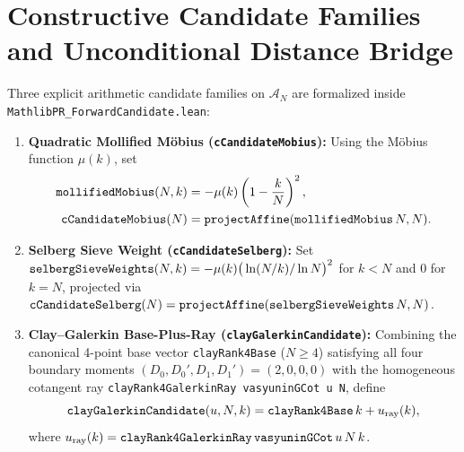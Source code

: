 \documentclass[11pt,a4paper]{article}
\theoremstyle{definition}
\begin{document}
\section{Constructive Candidate Families and Unconditional Distance Bridge}\label{sec:candidates}

Three explicit arithmetic candidate families on $\mathcal{A}_N$ are formalized inside \texttt{MathlibPR\_\allowbreak ForwardCandidate.lean}:
\begin{enumerate}[noitemsep]
  \item \textbf{Quadratic Mollified M\"obius (\texttt{cCandidateMobius}):} Using the M\"obius function $\mu(k)$, set
  \begin{align}
  \text{\texttt{mollifiedMobius}}(N, k) &= -\mu(k)\left(1 - \frac{k}{N}\right)^2, \\
  \text{\texttt{cCandidateMobius}}(N) &= \text{\texttt{projectAffine}}(\text{\texttt{mollifiedMobius}}\, N, N).
  \end{align}
  \item \textbf{Selberg Sieve Weight (\texttt{cCandidateSelberg}):} Set $\text{\texttt{selbergSieveWeights}}(N, k) = -\mu(k)\big(\ln(N/k)/\ln N\big)^2$ for $k < N$ and $0$ for $k = N$, projected via $\text{\texttt{cCandidateSelberg}}(N) = \text{\texttt{projectAffine}}(\text{\texttt{selbergSieveWeights}}\, N, N)$.
  \item \textbf{Clay--Galerkin Base-Plus-Ray (\texttt{clayGalerkinCandidate}):} Combining the canonical 4-point base vector \texttt{clayRank4Base} ($N \ge 4$) satisfying all four boundary moments $(D_0, D_0', D_1, D_1') = (2, 0, 0, 0)$ with the homogeneous cotangent ray \texttt{clayRank4GalerkinRay vasyuninGCot u N}, define
  \begin{equation}
  \text{\texttt{clayGalerkinCandidate}}(u, N, k) = \text{\texttt{clayRank4Base}}\, k + u_{\text{ray}}(k),
  \end{equation}
  where $u_{\text{ray}}(k) = \text{\texttt{clayRank4GalerkinRay}}\, \text{\texttt{vasyuninGCot}}\, u\, N\, k$.
\end{enumerate}
\end{document}
